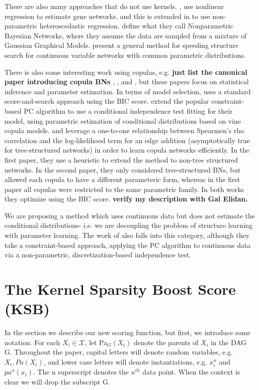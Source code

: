 \documentclass{article} %
\begin{document}
There are also many approaches that do not use kernels.  \cite{imoto2001estimation}, use nonlinear regression to estimate gene networks, and this is extended in \cite{imoto2003bayesian} to use non-parametric heteroscedastic regression.  \cite{ickstadt2010nonparametric} define what they call Nonparametric Bayesian Networks, where they assume the data are sampled from a mixture of Gaussian Graphical Models. \cite{elidan2007ideal} present a general method for speeding structure search for continuous variable networks with common parametric distributions. 

There is also some interesting work using copulas, e.g. {\bf just list the canonical paper introducing copula BNs}  \cite{hanea2006hybrid}, \cite{hanea2008mixed}, and \cite{hanea2010mining}, but these papers focus on statistical inference and parameter estimation.  In terms of model selection, \cite{elidan2010copula} uses a standard score-and-search approach using the BIC score.  \cite{bauer2012pair} extend the popular constraint-based PC algorithm to use a conditional independence test fitting for their model, using parametric estimation of conditional distributions based on vine copula models.  \cite{elidan2012lightning} and \cite{tenzer2013speedy} leverage a one-to-one relationship between Spearmen's rho correlation and the log-likelihood term for an edge addition (asymptotically true for tree-structured networks) in order to learn copula networks efficiently.  In the first paper, they use a heuristic to extend the method to non-tree structured networks.  In the second paper, they only considered tree-structured BNs, but allowed each copula to have a different parameteric form, whereas in the first paper all copulas were restricted to the same parametric family.  In both works they optimize using the BIC score. {\bf verify my description with Gal Elidan.}

We are proposing a method which uses continuous data but does not estimate the conditional distributions- i.e. we are decoupling the problem of structure learning with parameter learning.  The work of \cite{margaritis2005distribution} also falls into this category, although they take a constraint-based approach, applying the PC algorithm to continuous data via a non-parametric, discretization-based independence test.

\section{The Kernel Sparsity Boost Score (KSB)}
In the section we describe our new scoring function, but first, we introduce some notation.  For each $X_i \in \mathcal{X}$, let Pa$_G(X_i)$ denote the parents of $X_i$ in the DAG G.   Throughout the paper, capital letters will denote random variables, e.g. $X_i, Pa(X_i)$, and lower case letters will denote instantiations, e.g. $x_i^n$ and $pa^n(x_i)$.  The n superscript denotes the $n^{th}$ data point.   When the context is clear we will drop the subscript G.  
\end{document}

